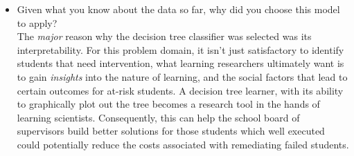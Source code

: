 \documentclass[twoside,openright,titlepage,numbers=noenddot,headinclude,%
               footinclude=true,cleardoublepage=empty,abstractoff,BCOR=5mm,%
               paper=a4,fontsize=11pt,ngerman,american]{scrreprt}
\numberwithin{theorem}{chapter}
\numberwithin{definition}{chapter}
\numberwithin{algorithm}{chapter}
\numberwithin{figure}{chapter}
\numberwithin{table}{chapter}
\numberwithin{equation}{chapter}
\begin{document}
\begin{itemize}
\item Given what you know about the data so far, why did you choose this model to apply?\\
The \textit{major} reason why the decision tree classifier was selected was its interpretability. For this problem domain, it isn't just satisfactory to identify students that need intervention, what learning researchers ultimately want is to gain \textit{insights} into the nature of learning, and the social factors that lead to certain outcomes for at-risk students. A decision tree learner, with its ability to graphically plot out the tree becomes a research tool in the hands of learning scientists. Consequently, this can help the school board of supervisors build better solutions for those students which well executed could potentially reduce the costs associated with remediating failed students.\\

\end{itemize} 




\end{document}

